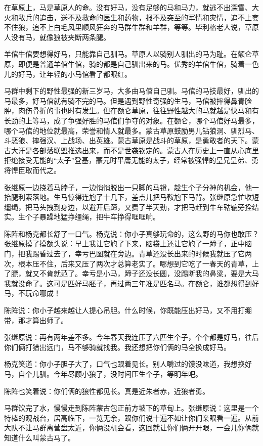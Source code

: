 \par 在草原上，马是草原人的命。没有好马，没有足够的马和马力，就逃不出深雪、大火和敌兵的追击，送不及救命的医生和药物，报不及突至的军情和灾情，追不上套不住狼，追不上白毛风里顺风狂奔的马群牛群和羊群，等等。毕利格老人说，草原人没有马，就像狼被夹断两条腿。
\par 羊倌牛倌要想得好马，只能靠自己驯马。草原人以骑别人驯出的马为耻。在额仑草原，即便是普通羊倌牛倌，骑的都是自己驯出来的马。优秀的羊倌牛倌，骑着一色儿的好马，让年轻的小马倌看了都眼红。
\par 马群中剩下的野性最强的新三岁马，大多由马倌自己驯。马倌的马技最好，驯出的马最多，好马倌就有骑不完的马。但是遇到野性奇强的生马，马倌被摔得鼻青脸肿，肉伤骨折的事也时有发生。但在额仑草原，往往野性越大的马就越是快马和有长劲的上等马，成了争强好胜的马倌们争夺的对象。在额仑，哪个马倌好马最多，哪个马倌的地位就最高，荣誉和情人就最多。蒙古草原鼓励男儿钻狼洞、驯烈马、斗恶狼、摔强汉、上战场、出英雄。蒙古草原是战斗的草原，是勇敢者的天下。蒙古大汗是各部落联盟推选出来，而不是世袭钦定的。蒙古人在历史上一直从心底里拒绝接受无能的“太子”登基，蒙元时平庸无能的太子，经常被强悍的皇兄皇弟、勇将悍臣取而代之。
\par 张继原一边挠着马脖子，一边悄悄脱出一只脚的马镫，趁生个子分神的机会，他一抬腿利索落地。生马惊得连尥了十几下，差点儿把马鞍尥下马背。张继原急忙收短缰绳，把马头拽到身边，以避开后蹄，又费了半天劲，才把马赶到牛车轱辘旁拴结实。生个子暴躁地猛挣缰绳，把牛车挣得哐哐响。
\par 陈阵和杨克都长舒了一口气。杨克说：你小子真够玩命的，这么野的马你也敢压？张继原摸了摸额头说：早上我让它尥了下来，脑袋上还让它尥了一蹄子，正中脑门，把我踢昏过去了，幸亏巴图就在旁边。青草还没长出来的时候我就压了它两次，根本压不住，后来又压了两次才总算老实了。哪想到它吃了一春天的青草，上了膘，就又不肯就范了。幸亏是小马，蹄子还没长圆，没踢断我的鼻梁，要是大马我就没命了。这可是匹好马胚子，再过两三年准是匹名马。在额仑，谁都想得到好马，不玩命哪成！
\par 陈阵说：你小子越来越让人提心吊胆。什么时候，你既能压出好马，又不用打绷带，那才算出师了。
\par 张继原说：再有两年差不多。今年春天我连压了六匹生个子，个个都是好马，往后你们俩打猎出远门，马不够骑就找我。我还想把你们俩的马全换成好马。
\par 杨克笑道：你小子胆子大了，口气也跟着见长。别人嚼过的馍没味道，我想换好马，自个儿驯。今年尽顾小狼了，没时间压生个子，等明年吧。
\par 陈阵也笑着说：你们俩的狼性都见长。真是近朱者赤，近狼者勇。
\par 马群饮完了水，慢慢走到陈阵蒙古包正前方坡下的草甸上。张继原说：这里是一个特棒的观战台，居高临下，一览无余，跟你们说十遍不如让你们亲眼看一遍。从前大队不让马群离营盘太近，你俩没机会看，这回就让你们俩开开眼，一会儿你俩就知道什么叫蒙古马了。
